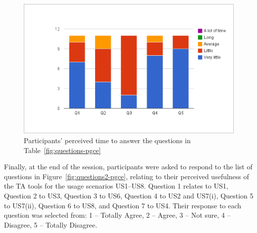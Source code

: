 
\begin{figure}[htbp]
  \centering
    \includegraphics[width=\textwidth]{gfx/perceived-time-Q1-Q5.eps}
  \caption{Participants' perceived time to answer the questions in
Table~\ref{fig:questions-pgce}} 
\label{fig:perceived-time}
\end{figure}


Finally, at the end of the session, 
participants were asked to respond to the list of
questions in Figure~\ref{fig:questions2-pgce}, 
relating to their perceived usefulness of the TA tools for
the usage scenarios US1--US8. Question 1 relates to US1, Question 2 to US3, 
Question 3 to US6, Question 4 to US2 and US7(i), Question 5 to US7(ii), 
Question 6 to US8, and Question 7 to US4. Their
response to each question was selected from: 1 -- Totally Agree,
2 -- Agree, 3 -- Not sure, 4 -- Disagree, 5 -- Totally Disagree.

